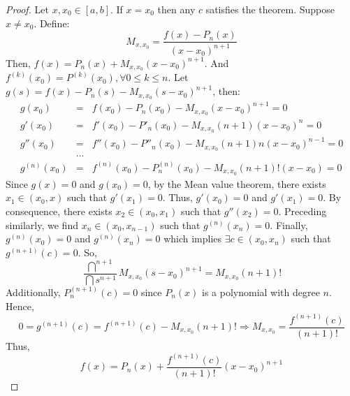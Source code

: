 \begin{proof}
    Let $x, x_0 \in [a,b]$. If $x = x_0$ then any $c$ satisfies the theorem. Suppose $x \neq x_0$. Define:
    \begin{equation*}
        M_{x, x_0} = \frac{f(x) - P_n(x)}{(x-x_0)^{n+1}}
    \end{equation*}
    Then, $f(x) = P_n(x) + M_{x, x_0}(x-x_0)^{n+1}$. And $f^{(k)}(x_0) = P^{(k)}(x_0), \forall 0 \leq k \leq n$. Let $g(s) = f(x) - P_n(s) - M_{x, x_0}(s-x_0)^{n+1}$, then:
    \begin{eqnarray*}
        g(x_0) &=& f(x_0) - P_n(x_0) - M_{x,x_0}(x-x_0)^{n+1} = 0 \\
        g'(x_0) &=& f'(x_0) - P'_n(x_0) - M_{x,x_0}(n+1)(x-x_0)^{n} = 0 \\
        g''(x_0) &=& f''(x_0) - P''_n(x_0) - M_{x,x_0}(n+1)n(x-x_0)^{n-1} = 0 \\
        &...& \\
        g^{(n)}(x_0) &=& f^{(n)}(x_0) - P^{(n)}_n(x_0) - M_{x,x_0}(n+1)!(x-x_0) = 0
    \end{eqnarray*}
    Since $g(x) = 0$ and $g(x_0) = 0$, by the Mean value theorem, there exists $x_1 \in (x_0, x)$ such that $g'(x_1) = 0$. Thus, $g'(x_0) = 0$ and $g'(x_1) = 0$. By consequence, there exists $x_2 \in (x_0, x_1)$ such that $g''(x_2) = 0$. Preceding similarly, we find $x_n \in (x_0, x_{n-1})$ such that $g^{(n)}(x_n) = 0$. Finally, $g^{(n)}(x_0) = 0$ and $g^{(n)}(x_n) = 0$ which implies $\exists c \in (x_0, x_n)$ such that $g^{(n+1)}(c) = 0$. So,
    \begin{equation*}
        \frac{\dint ^{n+1}}{\dint s^{n+1}} M_{x, x_0}(s - x_0)^{n+1} = M_{x, x_0}(n+1)!
    \end{equation*}
    Additionally, $P_n^{(n+1)}(c) = 0$ since $P_n(x)$ is a polynomial with degree $n$. Hence,
    \begin{equation*}
        0 = g^{(n+1)}(c) = f^{(n+1)}(c) - M_{x, x_0}(n+1)! \Longrightarrow M_{x, x_0} = \frac{f^{(n+1)}(c)}{(n+1)!}
    \end{equation*}
    Thus,
    \begin{equation*}
        f(x) = P_n(x) + \frac{f^{(n+1)}(c)}{(n+1)!}(x-x_0)^{n+1}
    \end{equation*}
    
\end{proof}